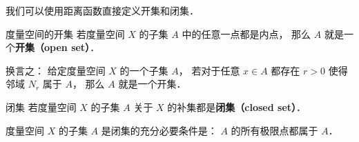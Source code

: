 

我们可以使用距离函数直接定义开集和闭集．
\begin{definition}{度量空间的开集}
若度量空间 $X$ 的子集 $A$ 中的任意一点都是内点， 那么 $A$ 就是一个\textbf{开集（open set）}．

换言之： 给定度量空间 $X$ 的一个子集 $A$， 若对于任意 $x \in A$ 都存在 $r > 0$ 使得邻域 $N_r$ 属于 $A$， 那么 $A$ 就是一个开集．
\end{definition}

\begin{definition}{闭集}
若度量空间 $X$ 的子集 $A$ 关于 $X$ 的补集都是\textbf{闭集（closed set）}．
\end{definition}

\begin{theorem}{}
度量空间 $X$ 的子集 $A$ 是闭集的充分必要条件是： $A$ 的所有极限点都属于 $A$．
\end{theorem}
